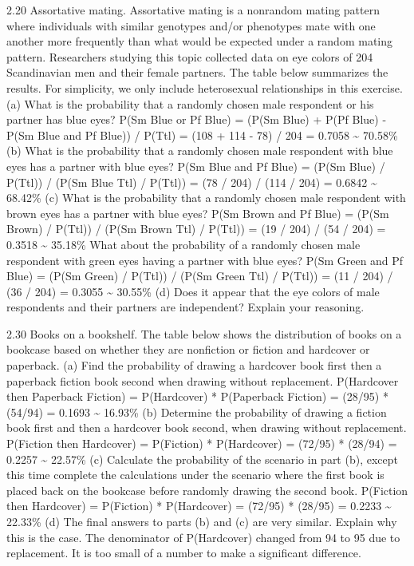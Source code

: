 \documentclass[]{article}
\begin{document}
2.20 Assortative mating. Assortative mating is a nonrandom mating
pattern where individuals with similar genotypes and/or phenotypes mate
with one another more frequently than what would be expected under a
random mating pattern. Researchers studying this topic collected data on
eye colors of 204 Scandinavian men and their female partners. The table
below summarizes the results. For simplicity, we only include
heterosexual relationships in this exercise. (a) What is the probability
that a randomly chosen male respondent or his partner has blue eyes?
P(Sm Blue or Pf Blue) = (P(Sm Blue) + P(Pf Blue) - P(Sm Blue and Pf
Blue)) / P(Ttl) = (108 + 114 - 78) / 204 = 0.7058 \textasciitilde{}
70.58\% (b) What is the probability that a randomly chosen male
respondent with blue eyes has a partner with blue eyes? P(Sm Blue and Pf
Blue) = (P(Sm Blue) / P(Ttl)) / (P(Sm Blue Ttl) / P(Ttl)) = (78 / 204) /
(114 / 204) = 0.6842 \textasciitilde{} 68.42\% (c) What is the
probability that a randomly chosen male respondent with brown eyes has a
partner with blue eyes? P(Sm Brown and Pf Blue) = (P(Sm Brown) / P(Ttl))
/ (P(Sm Brown Ttl) / P(Ttl)) = (19 / 204) / (54 / 204) = 0.3518
\textasciitilde{} 35.18\% What about the probability of a randomly
chosen male respondent with green eyes having a partner with blue eyes?
P(Sm Green and Pf Blue) = (P(Sm Green) / P(Ttl)) / (P(Sm Green Ttl) /
P(Ttl)) = (11 / 204) / (36 / 204) = 0.3055 \textasciitilde{} 30.55\% (d)
Does it appear that the eye colors of male respondents and their
partners are independent? Explain your reasoning.

2.30 Books on a bookshelf. The table below shows the distribution of
books on a bookcase based on whether they are nonfiction or fiction and
hardcover or paperback. (a) Find the probability of drawing a hardcover
book first then a paperback fiction book second when drawing without
replacement. P(Hardcover then Paperback Fiction) = P(Hardcover) *
P(Paperback Fiction) = (28/95) * (54/94) = 0.1693 \textasciitilde{}
16.93\% (b) Determine the probability of drawing a fiction book first
and then a hardcover book second, when drawing without replacement.
P(Fiction then Hardcover) = P(Fiction) * P(Hardcover) = (72/95) *
(28/94) = 0.2257 \textasciitilde{} 22.57\% (c) Calculate the probability
of the scenario in part (b), except this time complete the calculations
under the scenario where the first book is placed back on the bookcase
before randomly drawing the second book. P(Fiction then Hardcover) =
P(Fiction) * P(Hardcover) = (72/95) * (28/95) = 0.2233 \textasciitilde{}
22.33\% (d) The final answers to parts (b) and (c) are very similar.
Explain why this is the case. The denominator of P(Hardcover) changed
from 94 to 95 due to replacement. It is too small of a number to make a
significant difference.
\end{document}
